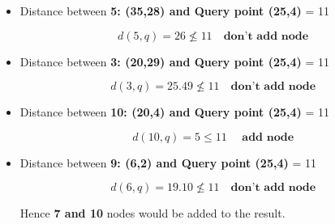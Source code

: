 \documentclass{article}
\begin{document}
\begin{itemize}
    \item Distance between \textbf{5: (35,28) and Query point (25,4)} \epsilon = 11

     \[ d(5,q)= 26 \nleq 11 \quad \textbf{don't add node } \]

     \item Distance between \textbf{3: (20,29) and Query point (25,4)} \epsilon = 11

     \[ d(3,q)= 25.49 \nleq 11 \quad \textbf{don't add node } \]

     \item Distance between \textbf{10: (20,4) and Query point (25,4)} \epsilon = 11

     \[ d(10,q)= 5 \leq 11 \quad \textbf{ add node } \]

      \item Distance between \textbf{9: (6,2) and Query point (25,4)} \epsilon = 11

     \[ d(6,q)= 19.10 \nleq 11 \quad \textbf{don't add node } \]


     Hence \textbf{7 and 10 } nodes would be added to the result.




    
\end{itemize}
    
    
\end{document}

